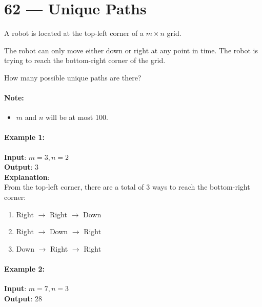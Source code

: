 \section{62 --- Unique Paths}
A robot is located at the top-left corner of a $m \times n$ grid.
\par
The robot can only move either down or right at any point in time. The robot is trying to reach the bottom-right corner of the grid.
\begin{figure}[H]
\end{figure}
How many possible unique paths are there?
\\
\paragraph{Note:}
\begin{itemize}
\item $m$ and $n$ will be at most 100.
\end{itemize}
\paragraph{Example 1:}
\begin{flushleft}
\textbf{Input}: $m = 3, n = 2$
\\
\textbf{Output}: 3
\\
\textbf{Explanation}:
\\
From the top-left corner, there are a total of 3 ways to reach the bottom-right corner:
\begin{enumerate}
\item Right $\to$ Right $\to$ Down
\item Right $\to$ Down $\to$ Right
\item Down $\to$ Right $\to$ Right
\end{enumerate}
\end{flushleft}

\paragraph{Example 2:}
\begin{flushleft}
\textbf{Input}: $m = 7, n = 3$
\\
\textbf{Output}: 28
\end{flushleft}

